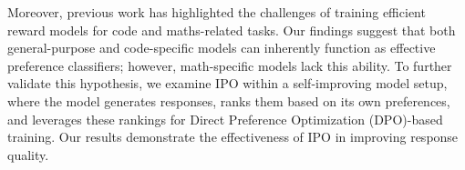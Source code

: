 Moreover, previous work has highlighted the challenges of training efficient reward models for code and maths-related tasks. Our findings suggest that both general-purpose and code-specific models can inherently function as effective preference classifiers; however, math-specific models lack this ability. To further validate this hypothesis, we examine IPO within a self-improving model setup, where the model generates responses, ranks them based on its own preferences, and leverages these rankings for Direct Preference Optimization (DPO)-based training. Our results demonstrate the effectiveness of IPO in improving response quality.

